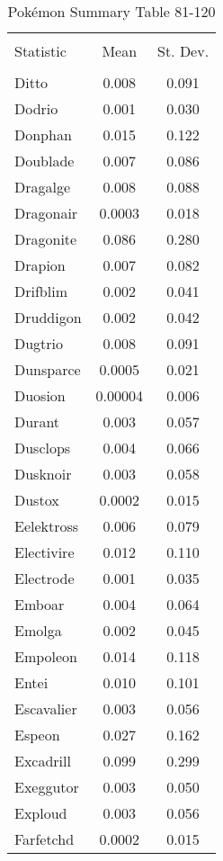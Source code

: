 \documentclass[12pt,twoside]{reedthesis}
\begin{document}
  \begin{table}[!htbp] \centering 
    \caption{Pokémon Summary Table 81-120} 
    \label{} 
  \begin{tabular}{@{\extracolsep{5pt}}lcc} 
  \\[-1.8ex]\hline 
  \hline \\[-1.8ex] 
  Statistic & \multicolumn{1}{c}{Mean} & \multicolumn{1}{c}{St. Dev.} \\ 
  \hline \\[-1.8ex] 
  Ditto & 0.008 & 0.091 \\ 
  Dodrio & 0.001 & 0.030 \\ 
  Donphan & 0.015 & 0.122 \\ 
  Doublade & 0.007 & 0.086 \\ 
  Dragalge & 0.008 & 0.088 \\ 
  Dragonair & 0.0003 & 0.018 \\ 
  Dragonite & 0.086 & 0.280 \\ 
  Drapion & 0.007 & 0.082 \\ 
  Drifblim & 0.002 & 0.041 \\ 
  Druddigon & 0.002 & 0.042 \\ 
  Dugtrio & 0.008 & 0.091 \\ 
  Dunsparce & 0.0005 & 0.021 \\ 
  Duosion & 0.00004 & 0.006 \\ 
  Durant & 0.003 & 0.057 \\ 
  Dusclops & 0.004 & 0.066 \\ 
  Dusknoir & 0.003 & 0.058 \\ 
  Dustox & 0.0002 & 0.015 \\ 
  Eelektross & 0.006 & 0.079 \\ 
  Electivire & 0.012 & 0.110 \\ 
  Electrode & 0.001 & 0.035 \\ 
  Emboar & 0.004 & 0.064 \\ 
  Emolga & 0.002 & 0.045 \\ 
  Empoleon & 0.014 & 0.118 \\ 
  Entei & 0.010 & 0.101 \\ 
  Escavalier & 0.003 & 0.056 \\ 
  Espeon & 0.027 & 0.162 \\ 
  Excadrill & 0.099 & 0.299 \\ 
  Exeggutor & 0.003 & 0.050 \\ 
  Exploud & 0.003 & 0.056 \\ 
  Farfetchd & 0.0002 & 0.015 \\ 

\end{tabular}
\end{table}
\end{document}
